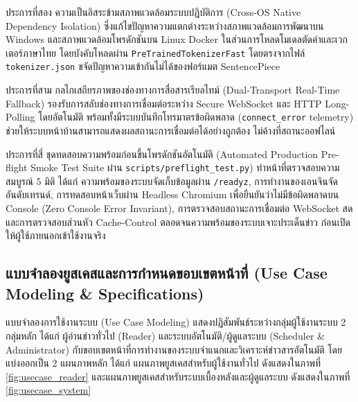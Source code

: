 ประการที่สอง ความเป็นอิสระข้ามสภาพแวดล้อมระบบปฏิบัติการ (Cross-OS Native Dependency Isolation) ซึ่งแก้ไขปัญหาความแตกต่างระหว่างสภาพแวดล้อมการพัฒนาบน Windows และสภาพแวดล้อมโพรดักชันบน Linux Docker ในส่วนการโหลดโมเดลตัดคำและเวกเตอร์ภาษาไทย โดยบังคับโหลดผ่าน \texttt{PreTrainedTokenizerFast} โดยตรงจากไฟล์ \texttt{tokenizer.json} ขจัดปัญหาความเข้ากันไม่ได้ของฟอร์แมต SentencePiece

ประการที่สาม กลไกเสถียรภาพของช่องทางการสื่อสารเรียลไทม์ (Dual-Transport Real-Time Fallback) รองรับการสลับช่องทางการเชื่อมต่อระหว่าง Secure WebSocket และ HTTP Long-Polling โดยอัตโนมัติ พร้อมทั้งมีระบบบันทึกโทรมาตรข้อผิดพลาด (\texttt{connect\_error} telemetry) ช่วยให้ระบบหน้าบ้านสามารถแสดงผลสถานะการเชื่อมต่อได้อย่างถูกต้อง ไม่ค้างที่สถานะออฟไลน์

ประการที่สี่ ชุดทดสอบความพร้อมก่อนขึ้นโพรดักชันอัตโนมัติ (Automated Production Pre-flight Smoke Test Suite ผ่าน \texttt{scripts/preflight\_test.py}) ทำหน้าที่ตรวจสอบความสมบูรณ์ 5 มิติ ได้แก่ ความพร้อมของระบบจัดเก็บข้อมูลผ่าน \texttt{/readyz}, การทำงานของเอนจินจัดอันดับเทรนด์, การทดสอบหน้าเว็บผ่าน Headless Chromium เพื่อยืนยันว่าไม่มีข้อผิดพลาดบน Console (Zero Console Error Invariant), การตรวจสอบสถานะการเชื่อมต่อ WebSocket สด และการตรวจสอบส่วนหัว Cache-Control ตลอดจนความพร้อมของระบบเจาะประเด็นข่าว ก่อนเปิดให้ผู้ใช้ภายนอกเข้าใช้งานจริง


\subsection{แบบจำลองยูสเคสและการกำหนดขอบเขตหน้าที่ (Use Case Modeling \& Specifications)}

แบบจำลองการใช้งานระบบ (Use Case Modeling) แสดงปฏิสัมพันธ์ระหว่างกลุ่มผู้ใช้งานระบบ 2 กลุ่มหลัก ได้แก่ ผู้อ่านข่าวทั่วไป (Reader) และระบบอัตโนมัติ/ผู้ดูแลระบบ (Scheduler \& Administrator) กับขอบเขตหน้าที่การทำงานของระบบจำแนกและวิเคราะห์ข่าวสารอัตโนมัติ โดยแบ่งออกเป็น 2 แผนภาพหลัก ได้แก่ แผนภาพยูสเคสสำหรับผู้ใช้งานทั่วไป ดังแสดงในภาพที่ \ref{fig:usecase_reader} และแผนภาพยูสเคสสำหรับระบบเบื้องหลังและผู้ดูแลระบบ ดังแสดงในภาพที่ \ref{fig:usecase_system}


